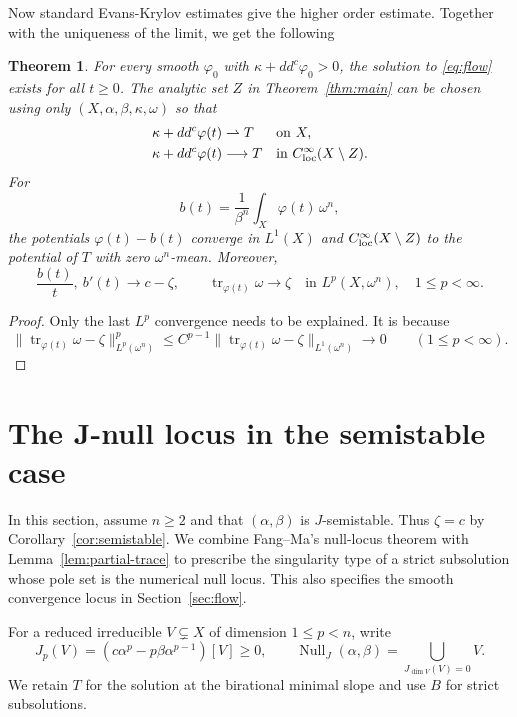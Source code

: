 \documentclass[reqno]{amsart}
\numberwithin{equation}{section}
\newtheorem{theorem}{Theorem}[section]
\theoremstyle{definition}
\DeclareMathOperator{\tr}{tr}
\DeclareMathOperator{\Null}{Null}
\newcommand{\ddc}{dd^c}
\begin{document}
Now standard Evans-Krylov estimates give the higher order estimate. Together with the uniqueness of the limit, we get the following
\begin{theorem}
For every smooth $\varphi_0$ with $\kappa+\ddc\varphi_0>0$, the solution to \eqref{eq:flow}
exists for all $t\ge0$. The analytic set $Z$ in
Theorem~\ref{thm:main} can be chosen using only
$(X,\alpha,\beta,\kappa,\omega)$ so that
\begin{equation}
 \begin{aligned}
 \kappa+\ddc\varphi(t)&\rightharpoonup T
       &&\text{on }X,\\
 \kappa+\ddc\varphi(t)&\longrightarrow T
       &&\text{in }C^\infty_{\rm loc}(X\setminus Z).
 \end{aligned}
\end{equation}
For
\[
 b(t)=\frac1{\beta^n}\int_X\varphi(t)\,\omega^n,
\]
the potentials $\varphi(t)-b(t)$ converge in $L^1(X)$ and
$C^\infty_{\rm loc}(X\setminus Z)$ to the potential of $T$ with
zero $\omega^n$-mean. Moreover,
\[
 \frac{b(t)}t,\ b'(t)\longrightarrow c-\zeta,\qquad
 \tr_{\varphi(t)}\omega\longrightarrow\zeta
       \quad\text{in }L^p(X,\omega^n),\quad 1\le p<\infty.
\]
\end{theorem}
\begin{proof}
    Only the last $L^p$ convergence needs to be explained. It is because \[
 \|\tr_{\varphi(t)}\omega-\zeta\|_{L^p(\omega^n)}^p
 \le C^{p-1}
    \|\tr_{\varphi(t)}\omega-\zeta\|_{L^1(\omega^n)}
 \longrightarrow0\qquad(1\le p<\infty).
\]
\end{proof}
\section{The J-null locus in the semistable case}\label{sec:null}

In this section, assume $n\ge2$ and that $(\alpha,\beta)$ is
$J$-semistable. Thus $\zeta=c$ by Corollary~\ref{cor:semistable}.
We combine Fang--Ma's null-locus theorem with
Lemma~\ref{lem:partial-trace} to prescribe the singularity type
of a strict subsolution whose pole set is the numerical null
locus. This also specifies the smooth convergence locus in
Section~\ref{sec:flow}.

For a reduced irreducible $V\subsetneq X$ of dimension $1\le p<n$,
write
\begin{equation}\label{eq:null-defect}
 J_p(V)=(c\alpha^p-p\beta\alpha^{p-1})[V]\ge0,
 \qquad
 \Null_J(\alpha,\beta)=\bigcup_{J_{\dim V}(V)=0}V.
\end{equation}
We retain $T$ for the solution at the birational minimal slope and
use $B$ for strict subsolutions.
\end{document}
